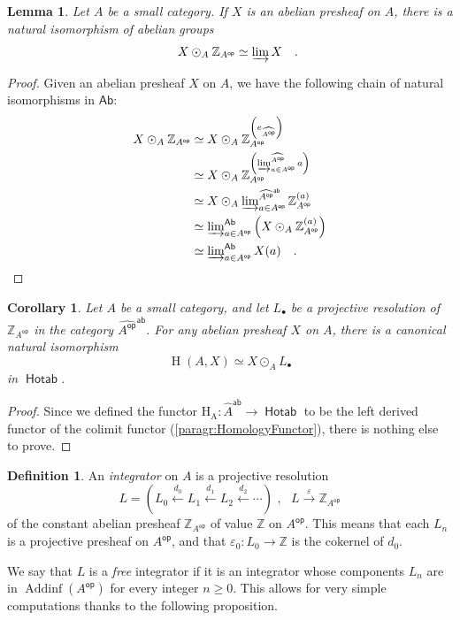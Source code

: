 \documentclass[10pt, english, a4paper, nothms]{amsart}
\theoremstyle{plain}
\newtheorem{lemme}[theorem]{Lemma}
\newtheorem{coro}[theorem]{Corollary}
\theoremstyle{remark}
\theoremstyle{definition}
\newtheorem{defin}[theorem]{Definition}
\numberwithin{equation}{theorem}
\renewcommand\geq\geqslant
\newcommand\Z{\mathbb{Z}}
\let\limind\varinjlim
\DeclareMathOperator{\op}{\mathsf{op}}
\newcommand{\pref}[1]{{\widehat{ #1 }}}
\newcommand{\Hotab}{\operatorname{\mathsf{Hotab}}}
\newcommand{\Ab}{{\mathsf{Ab}}}
\newcommand{\Addinf}{\operatorname{\mathrm{Addinf}}}
\newcommand{\Wh}[2]{\Z_{#1}^{\left(#2\right)}}
\renewcommand{\H}[2]{\operatorname{{H}}(#1,#2)}
\newcommand{\Hf}[1]{\operatorname{H_{#1}}}
\newcommand{\prefab}[1]{\widehat{ #1 }^{\mathsf{ab}}}
\let\epsilon\varepsilon
\newcommand{\mdvirg}{\text{ ,}\hspace{10pt}}
\newcommand\zbox[1]{\makebox[0pt][l]{#1}}
\newcommand\pbox[1]{\zbox{\quad #1}} %
\begin{document}
\begin{lemme}
Let $A$ be a small category. If $X$ is an abelian presheaf
on $A$, there is a natural isomorphism of abelian groups
\[
X \odot_A \Z_{{A}^{\op}} \simeq \limind X \pbox{.}
\]
\end{lemme}
\begin{proof}
Given an abelian presheaf $X$ on $A$, we have the following chain of
natural isomorphisms in $\Ab$:
\begin{align*}
X \odot_A \Z_{A^{\op}} 
& \simeq X \odot_A \Wh{{A^{\op}}}{ e_{\pref{{A^{\op}}}} }\\
& \simeq X \odot_A 
\Wh{{A^{\op}}}{ \limind\nolimits_{a\in
{A^{\op}}}^{\pref{{A^{\op}}}} a }
\\ & \simeq X \odot_A \limind\nolimits_{a \in {A^{\op}}}^{\prefab{{A^{\op}}}}
\Wh{{A^{\op}}}{a} 
\\ & \simeq \limind\nolimits_{a \in {A^{\op}}}^{\Ab} 
\left( X \odot_A \Wh{{A^{\op}}}{a} \right)
\\ & \simeq \limind\nolimits_{a \in {A^{\op}}}^{\Ab} X(a) \pbox{.}
\qedhere
\end{align*}
\end{proof}

\begin{coro}
Let $A$ be a small category, and let $L_\bullet$ be a projective resolution of
$\Z_{{A}^{\op}}$ in the category $\prefab{{A}^{\op}}$. For any abelian presheaf
$X$ on $A$, there is a canonical natural isomorphism 
\[
\H{A}{X} \simeq X \odot_A L_\bullet
\]
in $\Hotab$.
\end{coro}
\begin{proof}
Since we defined the functor $\Hf{A}:\prefab{A}\to\Hotab$ to be the left derived
functor of the colimit functor (\ref{paragr:HomologyFunctor}), there is nothing
else to prove.
\end{proof}

\begin{defin}
An \emph{integrator} on $A$ is a projective resolution 
\[
L = \left( L_0 \xleftarrow{d_0} L_1 \xleftarrow{d_1} L_2 \xleftarrow{d_2} \cdots
\right) \mdvirg L
\xrightarrow{\epsilon} \Z_{{A}^{\op}}
\]
of the constant abelian presheaf $\Z_{{A}^{\op}}$ of value $\Z$ on ${A}^{\op}$.
This means that each $L_n$ is a projective presheaf on ${A}^{\op}$, and that
$\epsilon_0 : L_0 \to \Z$ is the cokernel of $d_0$.
\end{defin}

\paragr We say that $L$ is a \emph{free} integrator if it is an integrator whose
components $L_n$ are in $\Addinf({A}^{\op})$ for every integer $n \geq 0$. This
allows for very simple computations thanks to the following proposition.
\end{document}
